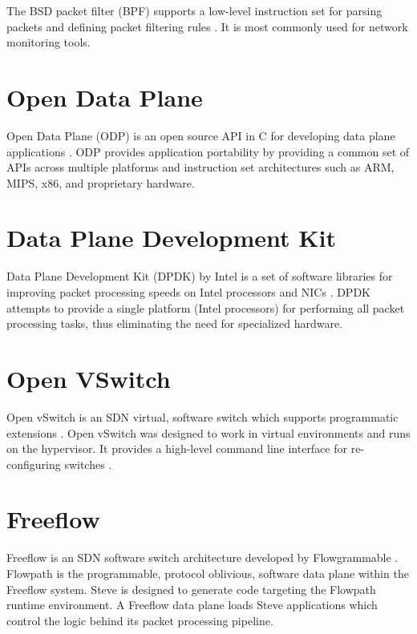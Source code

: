 The BSD packet filter (BPF) supports a low-level instruction set for parsing packets and defining packet filtering rules \cite{bpf1993mccanne}. It is most commonly used for network monitoring tools.

\section{Open Data Plane}
\label{rel:odp}

Open Data Plane (ODP) is an open source API in C for developing data plane applications \cite{odp_webpage}. ODP provides application portability by providing a common set of APIs across multiple platforms and instruction set architectures such as ARM, MIPS, x86, and proprietary hardware.

\section{Data Plane Development Kit}
\label{rel:odp}

Data Plane Development Kit (DPDK) by Intel is a set of software libraries for improving packet processing speeds on Intel processors and NICs \cite{dpdk_webpage}. DPDK attempts to provide a single platform (Intel processors) for performing all packet processing tasks, thus eliminating the need for specialized hardware.

\section{Open VSwitch}
\label{rel:vswitch}

Open vSwitch is an SDN virtual, software switch which supports programmatic extensions \cite{ovs_webpage, ovs2009extending, ovs2013}. Open vSwitch was designed to work in virtual environments and runs on the hypervisor. It provides a high-level command line interface for re-configuring switches \cite{ovs_man_page}.

\section{Freeflow}
\label{rel:freeflow}

Freeflow is an SDN software switch architecture developed
by Flowgrammable \cite{freeflow_software}. Flowpath is the programmable, protocol oblivious, software data plane within the Freeflow system. Steve is
designed to generate code targeting the Flowpath runtime environment. A Freeflow data plane loads Steve applications which control the logic behind its packet processing pipeline.
